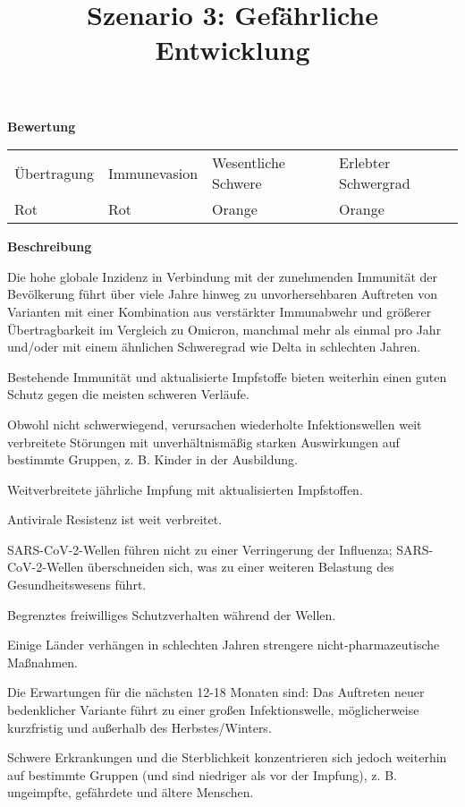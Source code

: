 \documentclass{article}
\begin{document}
\title{Szenario 3: Gefährliche Entwicklung}

\maketitle





\textbf{Bewertung}


\begin{tabu} to \textwidth { |X|X|X|X| }
\hline



Übertragung   & Immunevasion & Wesentliche Schwere & Erlebter Schwergrad
 \\


Rot & Rot & Orange & Orange
 \\
\hline

\end{tabu}




\textbf{Beschreibung}


Die hohe globale Inzidenz in Verbindung mit der zunehmenden Immunität der Bevölkerung führt über viele Jahre hinweg zu unvorhersehbaren Auftreten von Varianten mit einer Kombination aus verstärkter Immunabwehr und größerer Übertragbarkeit im Vergleich zu Omicron, manchmal mehr als einmal pro Jahr und/oder mit einem ähnlichen Schweregrad wie Delta in schlechten Jahren. 


Bestehende Immunität und aktualisierte Impfstoffe bieten weiterhin einen guten Schutz gegen die meisten schweren Verläufe. 


Obwohl nicht schwerwiegend, verursachen wiederholte Infektionswellen weit verbreitete Störungen mit unverhältnismäßig starken Auswirkungen auf bestimmte Gruppen, z. B. Kinder in der Ausbildung. 


Weitverbreitete jährliche Impfung mit aktualisierten Impfstoffen. 


Antivirale Resistenz ist weit verbreitet. 


SARS-CoV-2-Wellen führen nicht zu einer Verringerung der Influenza; SARS-CoV-2-Wellen überschneiden sich, was zu einer weiteren Belastung des Gesundheitswesens führt. 


Begrenztes freiwilliges Schutzverhalten während der Wellen. 


Einige Länder verhängen in schlechten Jahren strengere nicht-pharmazeutische Maßnahmen.


Die Erwartungen für die nächsten 12-18 Monaten sind: Das Auftreten  neuer bedenklicher Variante führt zu einer großen Infektionswelle, möglicherweise kurzfristig und außerhalb des Herbstes/Winters. 


Schwere Erkrankungen und die Sterblichkeit konzentrieren sich jedoch weiterhin auf bestimmte Gruppen (und sind niedriger als vor der Impfung), z. B. ungeimpfte, gefährdete und ältere Menschen.
\end{document}
